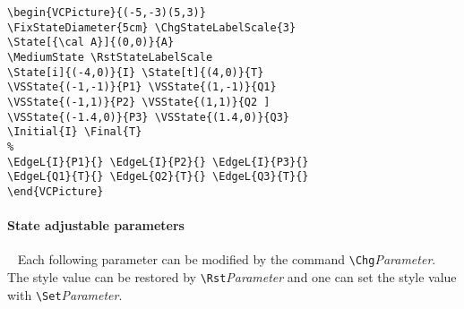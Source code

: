 \documentclass[11pt,twoside]{article}
\newlength{\parindenttemp} %
\newcommand{\noi}{\noindent}
\newlength{\jsIndent}%
\newlength{\ColSource}%
\newlength{\ColFigur}%
\begin{document}
\noi 
\hspace*{-\jsIndent}
\begin{minipage}[c]{\ColFigur}%
\par\vspace*{0mm}%
\begin{center}
{}%
\end{center}
\end{minipage}%
\hspace*{1.2em}%
\begin{minipage}[c]{\ColSource}
\setlength{\parindent}{\parindenttemp}%
\par\vspace*{0mm}%
\footnotesize
\begin{verbatim}
\begin{VCPicture}{(-5,-3)(5,3)}
\FixStateDiameter{5cm} \ChgStateLabelScale{3}
\State[{\cal A}]{(0,0)}{A}
\MediumState \RstStateLabelScale
\State[i]{(-4,0)}{I} \State[t]{(4,0)}{T}
\VSState{(-1,-1)}{P1} \VSState{(1,-1)}{Q1}
\VSState{(-1,1)}{P2} \VSState{(1,1)}{Q2 ]
\VSState{(-1.4,0)}{P3} \VSState{(1.4,0)}{Q3}
\Initial{I} \Final{T}
%
\EdgeL{I}{P1}{} \EdgeL{I}{P2}{} \EdgeL{I}{P3}{}
\EdgeL{Q1}{T}{} \EdgeL{Q2}{T}{} \EdgeL{Q3}{T}{}
\end{VCPicture}
\end{verbatim}
\normalsize
\end{minipage}%



\paragraph{State adjustable parameters}
~ Each following parameter can be modified by the command
\verb+\Chg+\textit{Parameter}. The style value can be restored by 
\verb+\Rst+\textit{Parameter} 
and one can set the style value with \verb+\Set+\textit{Parameter}.
\end{document}
